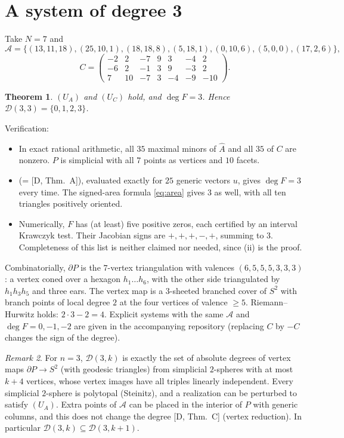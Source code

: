 \documentclass[11pt]{amsart}
\newtheorem{theorem}{Theorem}
\theoremstyle{remark}
\newtheorem{remark}[theorem]{Remark}
\newcommand{\A}{\mathcal A}
\begin{document}
\section{A system of degree 3}
Take $N=7$ and
\[
\A=\{(13,11,18),(25,10,1),(18,18,8),(5,18,1),(0,10,6),(5,0,0),(17,2,6)\},
\]
\[
C=\begin{pmatrix}
-2&2&-7&9&3&-4&2\\
-6&2&-1&3&9&-3&2\\
7&10&-7&3&-4&-9&-10
\end{pmatrix}.
\]
\begin{theorem}
$(U_A)$ and $(U_C)$ hold, and $\deg F=3$. Hence $\mathcal D(3,3)=\{0,1,2,3\}$.
\end{theorem}
Verification:
\begin{itemize}
\item[(i)] In exact rational arithmetic, all $35$ maximal minors of $\widehat A$ and all $35$ of $C$ are nonzero. $P$ is simplicial with all $7$ points as vertices and $10$ facets.
\item[(ii)] [B, Thm.~1.3] (= [D, Thm.~A]), evaluated exactly for $25$ generic vectors $u$, gives $\deg F=3$ every time. The signed-area formula \eqref{eq:area} gives $3$ as well, with all ten triangles positively oriented.
\item[(iii)] Numerically, $F$ has (at least) five positive zeros, each certified by an interval Krawczyk test. Their Jacobian signs are $+,+,+,-,+$, summing to $3$. Completeness of this list is neither claimed nor needed, since (ii) is the proof.
\end{itemize}
Combinatorially, $\partial P$ is the $7$-vertex triangulation with valences $(6,5,5,5,3,3,3)$: a vertex coned over a hexagon $h_1\dots h_6$, with the other side triangulated by $h_1h_3h_5$ and three ears.
The vertex map is a $3$-sheeted branched cover of $S^2$ with branch points of local degree $2$ at the four vertices of valence $\ge5$. Riemann--Hurwitz holds: $2\cdot3-2=4$.
Explicit systems with the same $\A$ and $\deg F=0,-1,-2$ are given in the accompanying repository (replacing $C$ by $-C$ changes the sign of the degree).

\begin{remark}
For $n=3$, $\mathcal D(3,k)$ is exactly the set of absolute degrees of vertex maps $\partial P\to S^2$ (with geodesic triangles) from simplicial $2$-spheres with at most $k+4$ vertices, whose vertex images have all triples linearly independent.
Every simplicial $2$-sphere is polytopal (Steinitz), and a realization can be perturbed to satisfy $(U_A)$.
Extra points of $\A$ can be placed in the interior of $P$ with generic columns, and this does not change the degree [D, Thm.~C] (vertex reduction).
In particular $\mathcal D(3,k)\subseteq\mathcal D(3,k+1)$.
\end{remark}
\end{document}
